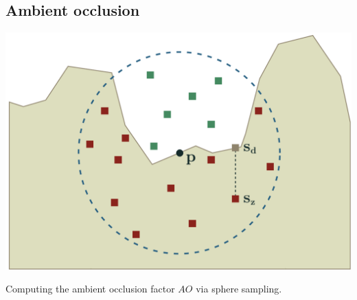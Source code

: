 \documentclass{ACGSeminar}
\begin{document}
	\subsection{Ambient occlusion}%
		\begin{floatingfigure}[r]{.5\textwidth}%
			\includegraphics[width=.5\textwidth]{img/ao_sphere_sampling.png}%

			\caption{Computing the ambient occlusion factor $AO$ via sphere sampling.}%
			\label{fig:ao_sphere_sampling}%
		\end{floatingfigure}%
\end{document}
